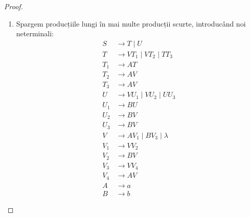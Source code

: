 \begin{proof}
\begin{enumerate}
              \newpage{}

        \item Spargem producțiile lungi în mai multe producții scurte, introducând noi neterminali:
              \begin{align*}
                  S   & \to T \mid U                     \\
                  T   & \to V T_1 \mid V T_2 \mid T T_3  \\
                  T_1 & \to AT                           \\
                  T_2 & \to AV                           \\
                  T_3 & \to AV                           \\
                  U   & \to V U_1 \mid V U_2 \mid U U_3  \\
                  U_1 & \to BU                           \\
                  U_2 & \to BV                           \\
                  U_3 & \to BV                           \\
                  V   & \to AV_1 \mid B V_3 \mid \lambda \\
                  V_1 & \to VV_2                         \\
                  V_2 & \to BV                           \\
                  V_3 & \to VV_4                         \\
                  V_4 & \to AV                           \\
                  A   & \to a                            \\
                  B   & \to b
              \end{align*}


\end{enumerate}
\end{proof}

